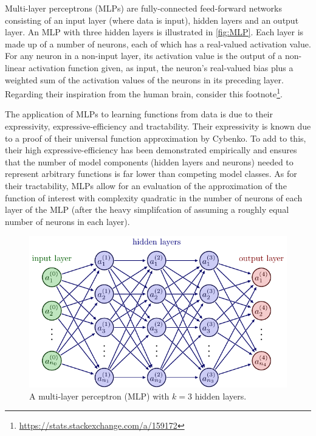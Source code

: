 \documentclass[11pt]{article}
\begin{document}
Multi-layer perceptrons (MLPs) are fully-connected feed-forward networks consisting of an input layer (where data is input), hidden layers and an output layer. An MLP with three hidden layers is illustrated in \autoref{fig:MLP}. Each layer is made up of a number of neurons, each of which has a real-valued activation value.  For any neuron in a non-input layer, its activation value is the output of a non-linear activation function given, as input, the neuron's real-valued bias plus a weighted sum of the activation values of the neurons in its preceding layer. Regarding their inspiration from the human brain, consider this footnote\footnote{\url{https://stats.stackexchange.com/a/159172}}.

The application of MLPs to learning functions from data is due to their expressivity, expressive-efficiency and tractability. Their expressivity is known due to a proof of their universal function approximation by Cybenko. To add to this, their high expressive-efficiency has been demonstrated empirically and ensures that the number of model components (hidden layers and neurons) needed to represent arbitrary functions is far lower than competing model classes. As for their tractability, MLPs allow for an evaluation of the approximation of the function of interest with complexity quadratic in the number of neurons of each layer of the MLP (after the heavy simplifcation of assuming a roughly equal number of neurons in each layer).

\begin{figure}[t]
    \centering
    \includegraphics[width=\linewidth]{./figures/neural_nets/MLP_1.pdf}
    \caption{A multi-layer perceptron (MLP) with $k=3$ hidden layers.}
    \label{fig:MLP}
\end{figure}
\end{document}
